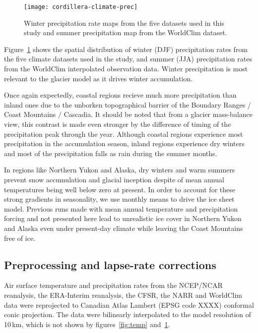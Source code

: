 \begin{figure}[t]
	\vspace*{2mm}
	\begin{center}
		\texttt{[image: cordillera-climate-prec]}
	\end{center}
	\caption{Winter precipitation rate maps from the five datasets used in this study and summer precipitation map from the WorldClim dataset.}
	\label{fig:prec}
\end{figure}

Figure~\ref{fig:prec} shows the spatial distribution of winter (DJF) precipitation rates from the five climate datasets used in the study, and summer (JJA) precipitation rates from the WorldClim interpolated observation data. Winter precipitation is most relevant to the glacier model as it drives winter accumulation.

Once again expectedly, coastal regions recieve much more precipitation than inland ones due to the unborken topographical barrier of the Boundary Ranges / Coast Mountains / Cascadia. It should be noted that from a glacier mass-balance view, this contrast is made even stronger by the difference of timing of the precipitation peak through the year. Although coastal regions experience most precipitation in the accumulation season, inland regions experience dry winters and most of the precipitation falls as rain during the summer months.

In regions like Northern Yukon and Alaska, dry winters and warm summers prevent snow accumulation and glacial inception despite of mean annual temperatures being well below zero at present. In order to account for these strong gradients in seasonality, we use monthly means to drive the ice sheet model. Previous runs made with mean annual temperature and precipitation forcing and not presented here lead to unrealistic ice cover in Northern Yukon and Alaska even under present-day climate while leaving the Coast Mountains free of ice.


\subsection{Preprocessing and lapse-rate corrections}

Air surface temperature and precipitation rates from the NCEP/NCAR reanalysis, the ERA-Interim reanalysis, the CFSR, the NARR and WorldClim data were reprojected to Canadian Atlas Lambert (EPSG code XXXX) conformal conic projection. The data were bilinearly interpolated to the model resolution of 10\,km, which is not shown by figures~\ref{fig:temp} and~\ref{fig:prec}.

